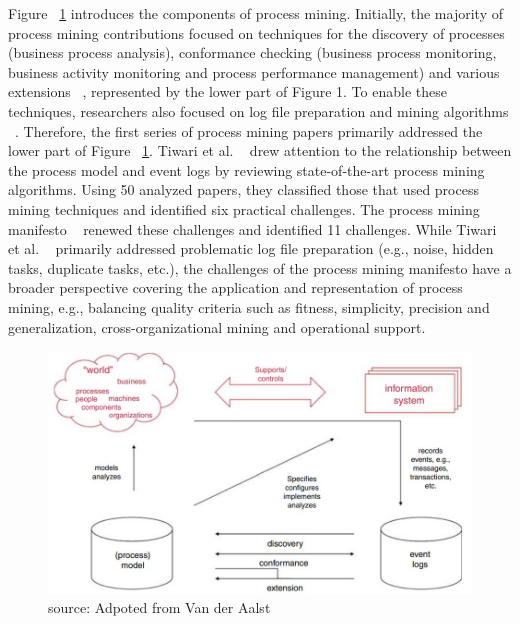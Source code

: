 Figure ~\ref{figure:BPMJ} introduces the components of process mining. Initially, the majority of process mining contributions focused on techniques for the discovery of processes (business process analysis), conformance checking (business process monitoring, business activity monitoring and process performance management) and various extensions ~\cite{song2008trace}, represented by the lower part of Figure 1. To enable these techniques, researchers also focused on log file preparation and mining algorithms ~\cite{weijters2006process}. Therefore, the first series of process mining papers primarily addressed the lower part of Figure ~\ref{figure:BPMJ}. Tiwari et al. ~\cite{tiwari2008review} drew attention to the relationship between the process model and event logs by reviewing state-of-the-art process mining algorithms. Using 50 analyzed papers, they classified those that used process mining techniques and identified six practical challenges. The process mining manifesto ~\cite{van2012process} renewed these challenges and identified 11 challenges. While Tiwari et al. ~\cite{tiwari2008review} primarily addressed problematic log file preparation (e.g., noise, hidden tasks, duplicate tasks, etc.), the challenges of the process mining manifesto have a broader perspective covering the application and representation of process mining, e.g., balancing quality criteria such as fitness, simplicity, precision and generalization, cross-organizational mining and operational support.


\begin{figure}[!htb]
    \centering 
    \includegraphics[scale=0.7]{resource/BPMJ.JPG}
    \caption{source: Adpoted from Van der Aalst ~\cite{van2011process}}
    \label{figure:BPMJ}
\end{figure}



